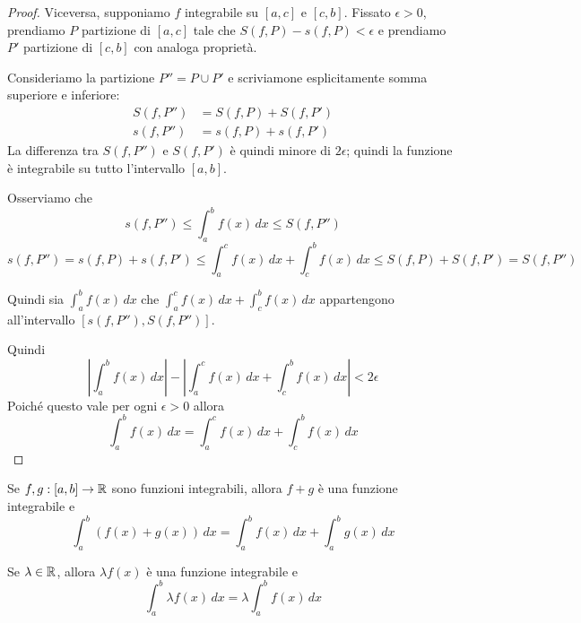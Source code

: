 \begin{proof}
Viceversa, supponiamo $f$ integrabile su $[a,c]$ e $[c,b]$. Fissato $\epsilon > 0$, prendiamo $P$ partizione di $[a,c]$ tale che $S(f,P)-s(f,P) < \epsilon$ e prendiamo $P'$ partizione di $[c,b]$ con analoga proprietà.

Consideriamo la partizione $P'' = P \cup P'$ e scriviamone esplicitamente somma superiore e inferiore:
\begin{align*}
S(f,P'') &= S(f,P) + S(f,P') \\
s(f,P'') &= s(f,P) + s(f,P') 
\end{align*}
La differenza tra $S(f,P'')$ e $S(f,P')$ è quindi minore di $2\epsilon$; quindi la funzione è integrabile su tutto l'intervallo $[a,b]$.

Osserviamo che
\begin{equation*}
s(f,P'') \le \int_a^b f(x) \, dx \le S(f,P'')
\end{equation*}
\begin{equation*}
s(f,P'') = s(f,P)+s(f,P') \le \int_a^c f(x) \, dx + \int_c^b f(x) \, dx \le S(f,P) + S(f,P') = S(f,P'')
\end{equation*}

Quindi sia $\int_a^b f(x) \, dx$ che $\int_a^c f(x) \, dx + \int_c^b f(x) \, dx$ appartengono all'intervallo $[s(f,P''), S(f,P'')]$.

Quindi
\begin{equation*}
\left\lvert \int_a^b f(x) \, dx \right\rvert - \left\lvert \int_a^c f(x) \, dx + \int_c^b f(x) \, dx \right\rvert < 2\epsilon
\end{equation*}
Poiché questo vale per ogni $\epsilon > 0$ allora
\begin{equation*}
\int_a^b f(x) \, dx = \int_a^c f(x) \, dx + \int_c^b f(x) \, dx
\end{equation*}
\end{proof}

\begin{proposition}
Se $f, g:[a,b] \to \mathbb R$ sono funzioni integrabili, allora $f+g$ è una funzione integrabile e
\begin{equation*}
\int_a^b (f(x)+g(x)) \, dx = \int_a^b f(x) \, dx + \int_a^b g(x) \, dx
\end{equation*}

Se $\lambda \in \mathbb R$, allora $\lambda f(x)$ è una funzione integrabile e
\begin{equation*}
\int_a^b \lambda f(x) \, dx = \lambda \int_a^b f(x) \, dx
\end{equation*}
\end{proposition}

